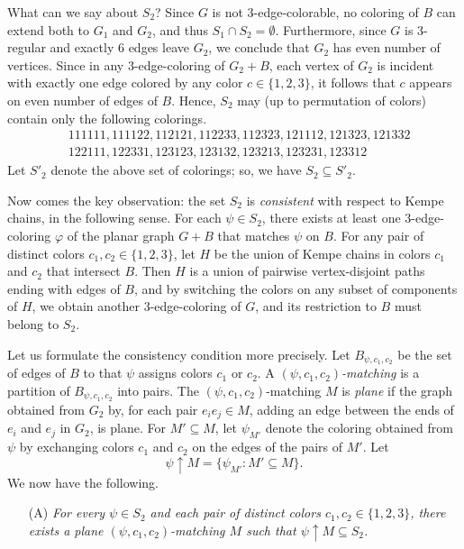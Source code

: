 \documentclass[12pt,twoside,openright,a4paper]{book}
\begin{document}
What can we say about $S_2$?
Since $G$ is not $3$-edge-colorable, no coloring of $B$ can extend both to $G_1$ and $G_2$, and thus $S_1\cap S_2=\emptyset$.
Furthermore, since $G$ is $3$-regular and exactly $6$ edges leave $G_2$, we conclude that $G_2$ has even number of vertices.
Since in any $3$-edge-coloring of $G_2+B$, each vertex of $G_2$ is incident with exactly one edge colored by any color $c\in\{1,2,3\}$,
it follows that $c$ appears on even number of edges of $B$.  Hence, $S_2$ may
(up to permutation of colors) contain only the following colorings.
\begin{align*}
&111111,111122,112121,112233,112323,121112,121323,121332\\
&122111,122331,123123,123132,123213,123231,123312
\end{align*}
Let $S'_2$ denote the above set of colorings; so, we have $S_2\subseteq S'_2$.

Now comes the key observation: the set $S_2$ is \emph{consistent} with respect to Kempe chains, in the following sense.
For each $\psi\in S_2$, there exists at least one $3$-edge-coloring $\varphi$ of the planar graph $G+B$
that matches $\psi$ on $B$.  For any pair of distinct colors $c_1,c_2\in \{1,2,3\}$, let $H$ be the union of Kempe chains
in colors $c_1$ and $c_2$ that intersect $B$.  Then $H$ is a union of pairwise vertex-disjoint paths ending with edges of $B$,
and by switching the colors on any subset of components of $H$, we obtain another $3$-edge-coloring of $G$, and its restriction to $B$ must belong to $S_2$.

Let us formulate the consistency condition more precisely.  Let $B_{\psi,c_1,c_2}$ be the set of edges of $B$ to that $\psi$ assigns colors $c_1$ or $c_2$.
A \emph{$(\psi,c_1,c_2)$-matching} is a partition of $B_{\psi,c_1,c_2}$ into pairs.  The $(\psi,c_1,c_2)$-matching $M$ is \emph{plane} if
the graph obtained from $G_2$ by, for each pair $e_ie_j\in M$, adding an edge between the ends of $e_i$ and $e_j$ in $G_2$, is plane.
For $M'\subseteq M$, let $\psi_{M'}$ denote the coloring obtained from $\psi$ by exchanging colors $c_1$ and $c_2$
on the edges of the pairs of $M'$.  Let
$$\psi\uparrow M=\{\psi_{M'}:M'\subseteq M\}.$$
We now have the following.
\begin{itemize}
\item[(A)] \emph{For every $\psi\in S_2$ and each pair of distinct colors $c_1,c_2\in \{1,2,3\}$,
there exists a plane $(\psi,c_1,c_2)$-matching $M$ such that $\psi\uparrow M\subseteq S_2$.}
\end{itemize}
\end{document}
